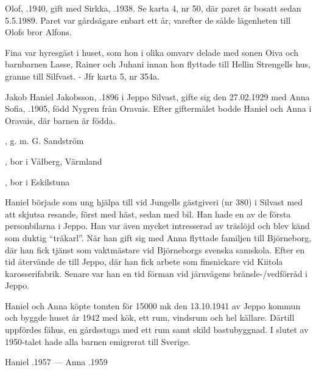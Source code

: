 Olof, .1940, gift med Sirkka, .1938. Se karta 4, nr 50, där paret är bosatt sedan 5.5.1989. Paret var gårdsägare enbart ett år, varefter de sålde lägenheten till Olofs bror Alfons.


Fina var hyresgäst i huset, som hon i olika omvarv delade med sonen Oiva och barnbarnen Lasse, Rainer och Juhani innan hon flyttade till Hellin Strengells hus, granne till Silfvast. - Jfr karta 5, nr 354a.


Jakob Haniel Jakobsson, .1896 i Jeppo Silvast, gifte sig den 27.02.1929 med Anna Sofia, .1905, född Nygren från Oravais. Efter giftermålet bodde Haniel och Anna i Oravais, där barnen är födda.
\begin{jhchildren}
  \item {}, g. m. G. Sandström
  \item {}
  \item {}, bor i Vålberg, Värmland
  \item {}, bor i Eskilstuna
\end{jhchildren}
Haniel började som ung hjälpa till vid Jungells gästgiveri (nr 380) i Silvast med att skjutsa resande, först med häst, sedan med bil. Han hade en av de första personbilarna i Jeppo. Han var även mycket intresserad av träslöjd och blev känd som duktig ``träkarl''. När han gift sig med Anna flyttade familjen till Björneborg, där han fick tjänst som vaktmästare vid Björneborgs svenska samskola. Efter en tid återvände de till Jeppo, där han fick arbete som finsnickare vid Kiitola karosserifabrik. Senare var han en tid förman vid järnvägens bränsle-/vedförråd i Jeppo.

Haniel och Anna köpte tomten för 15000 mk den 13.10.1941 av Jeppo kommun och byggde huset år 1942 med kök, ett rum, vindsrum och hel källare. Därtill uppfördes fähus, en gårdsstuga med ett rum samt skild bastubyggnad. I slutet av 1950-talet hade alla barnen emigrerat till Sverige.

Haniel .1957  ---  Anna .1959





